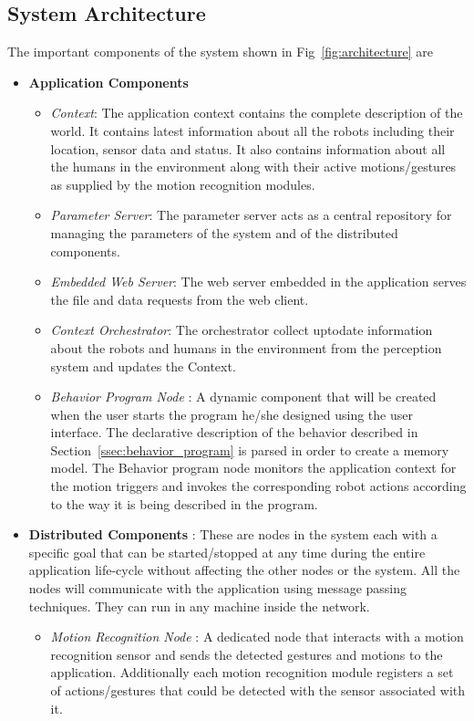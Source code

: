 \documentclass{llncs}
\begin{document}
\subsection{System Architecture}
The important components of the system shown in Fig~\ref{fig:architecture} are
\begin{itemize}
\item \textbf{Application Components}
\begin{itemize}
\item \emph{Context}: The application context contains the complete description of the world. It contains latest information about all the robots including their location, sensor data and status. It also contains information about all the humans in the environment along with their active motions/gestures as supplied by the motion recognition modules.
\item \emph{Parameter Server}: The parameter server acts as a central repository for managing the parameters of the system and of the distributed components.
\item \emph{Embedded Web Server}: The web server embedded in the application serves the file and data requests from the web client.
\item \emph{Context Orchestrator}: The orchestrator collect uptodate information about the robots and humans in the environment from the perception system and updates the Context.
\item \emph{Behavior Program Node} : A dynamic component that will be created when the user starts the program he/she designed using the user interface. The declarative description of the behavior described in Section~\ref{ssec:behavior_program} is parsed in order to create a memory model. The Behavior program node monitors the application context for the motion triggers and invokes the corresponding robot actions according to the way it is being described in the program.
\end{itemize}
\item \textbf{Distributed Components} : These are nodes in the system each with a specific goal that can be started/stopped at any time during the entire application life-cycle without affecting the other nodes or the system. All the nodes will communicate with the application using message passing techniques. They can run in any machine inside the network.
\begin{itemize}
\item \emph{Motion Recognition Node} : A dedicated node that interacts with a motion recognition sensor and sends the detected gestures and motions to the application. Additionally each motion recognition module registers a set of actions/gestures that could be detected with the sensor associated with it.

\end{itemize}
\end{itemize}
\end{document}
